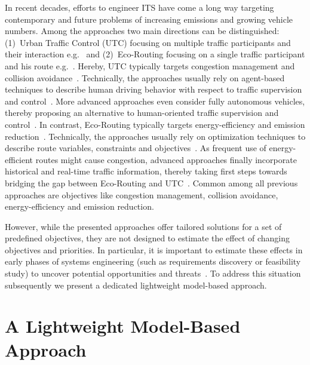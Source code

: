 \documentclass[conference]{../cls/IEEEtran}
\begin{document}
In recent decades, efforts to engineer ITS have come a long way targeting contemporary and future problems of increasing emissions and growing vehicle numbers. Among the approaches two main directions can be distinguished: (1)~Urban Traffic Control (UTC) focusing on multiple traffic participants and their interaction e.g.~\cite{Chen2010,Dresner2008} and (2)~Eco-Routing focusing on a single traffic participant and his route e.g.~\cite{Ericsson2006,Boriboonsomsin2012}. Hereby, UTC typically targets congestion management and collision avoidance~\cite{Chen2010}. Technically, the approaches usually rely on agent-based techniques to describe human driving behavior with respect to traffic supervision and control~\cite{Chen2010}. More advanced approaches even consider fully autonomous vehicles, thereby proposing an alternative to human-oriented traffic supervision and control~\cite{Dresner2008}. In contrast, Eco-Routing typically targets energy-efficiency and emission reduction~\cite{Ericsson2006}. Technically, the approaches usually rely on optimization techniques to describe route variables, constraints and objectives~\cite{Ericsson2006}. As frequent use of energy-efficient routes might cause congestion, advanced approaches finally incorporate historical and real-time traffic information, thereby taking first steps towards bridging the gap between Eco-Routing and UTC~\cite{Boriboonsomsin2012}. Common among all previous approaches are objectives like congestion management, collision avoidance, energy-efficiency and emission reduction.

However, while the presented approaches offer tailored solutions for a set of predefined objectives, they are not designed to estimate the effect of changing objectives and priorities. In particular, it is important to estimate these effects in early phases of systems engineering (such as requirements discovery or feasibility study) to uncover potential opportunities and threats~\cite{Whitten2005}. To address this situation subsequently we present a dedicated lightweight model-based approach.

\section{A Lightweight Model-Based Approach}
\label{sec:approach}
\end{document}
